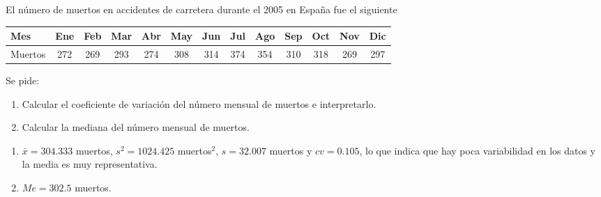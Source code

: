 {El número de muertos en  accidentes de carretera durante el 2005 en España fue el siguiente
\begin{center}
\begin{tabular}{|l|cccccccccccc|}
\hline
Mes & Ene & Feb & Mar & Abr & May & Jun & Jul & Ago & Sep & Oct & Nov & Dic\\
\hline
Muertos & 272 & 269 & 293 & 274 & 308 & 314 & 374 & 354 & 310 & 318 & 269 & 297\\
\hline
\end{tabular}
\end{center}
Se pide:
\begin{enumerate}
\item Calcular el coeficiente de variación del número mensual de muertos e interpretarlo.
\item Calcular la mediana del número mensual de muertos.
\end{enumerate}
}
{\begin{enumerate}
\item $\bar x=304.333$ muertos, $s^2=1024.425$ muertos$^2$, $s=32.007$ muertos y $cv =0.105$, lo que indica que hay poca variabilidad en los datos y la media es muy representativa.
\item $Me=302.5$ muertos.
\end{enumerate}
}
